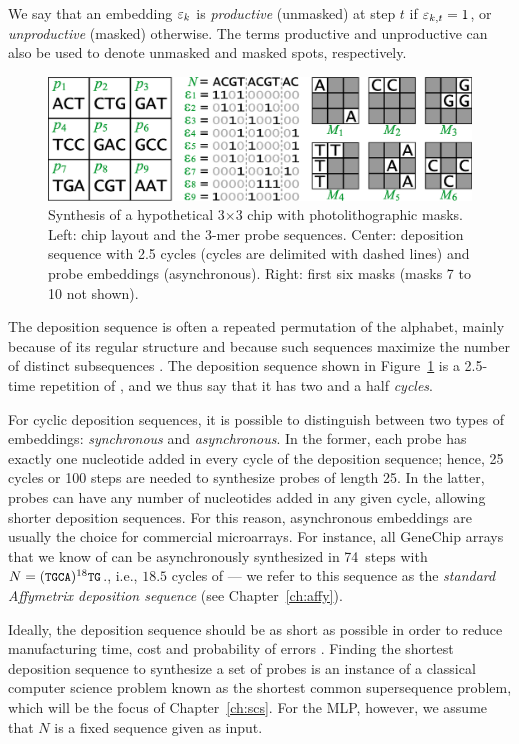 We say that an embedding $\varepsilon_k$ is \emph{productive} (unmasked) at step $t$ if
$\varepsilon_{k,t} = 1$, or \emph{unproductive} (masked) otherwise. The terms
productive and unproductive can also be used to denote unmasked and masked
spots, respectively.

\begin{figure}[t]\centering
\centerline{\includegraphics[width=\textwidth]{figures/chip.eps}}
\caption{Synthesis of a hypothetical 3$\times$3 chip with photolithographic
  masks. Left: chip layout and the 3-mer probe sequences. Center: deposition
  sequence with 2.5 cycles (cycles are delimited with dashed lines) and probe
  embeddings (asynchronous). Right: first six masks (masks 7 to 10 not shown).}
\label{fig:masking_process}
\end{figure}

The deposition sequence is often a repeated permutation of the alphabet, mainly
because of its regular structure and because such sequences maximize the number
of distinct subsequences \citep{Chase1976}. The deposition sequence shown in
Figure~\ref{fig:masking_process} is a 2.5-time repetition of , and we
thus say that it has two and a half \emph{cycles}.

For cyclic deposition sequences, it is possible to distinguish between two types
of embeddings: \emph{synchronous} and \emph{asynchronous}. In the former, each
probe has exactly one nucleotide added in every cycle of the deposition
sequence; hence, 25 cycles or 100 steps are needed to synthesize probes of
length 25. In the latter, probes can have any number of nucleotides added
in any given cycle, allowing shorter deposition sequences. For this reason,
asynchronous embeddings are usually the choice for commercial microarrays.  For
instance, all GeneChip arrays that we know of can be asynchronously synthesized
in 74~steps with $N=({\text{\small{\tt{TGCA}}}})^{18}{\text{\small{\tt{TG}}}}$., i.e., $18.5$ cycles of
 --- we refer to this sequence as the \emph{standard Affymetrix
deposition sequence} (see Chapter~\ref{ch:affy}).

Ideally, the deposition sequence should be as short as possible in order to
reduce manufacturing time, cost and probability of errors \citep{Rahmann2003}.
Finding the shortest deposition sequence to synthesize a set of probes is an
instance of a classical computer science problem known as the shortest common
supersequence problem, which will be the focus of Chapter~\ref{ch:scs}. For the
MLP, however, we assume that $N$ is a fixed sequence given as input.

